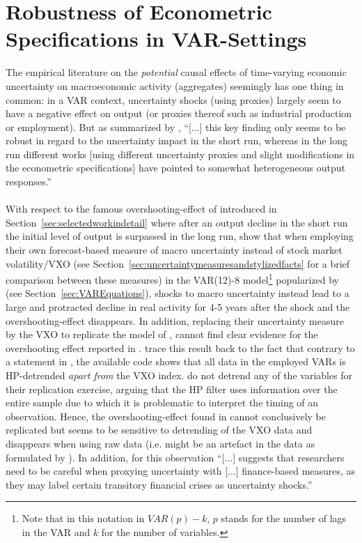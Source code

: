 \documentclass[a4paper,11pt,listof=nochaptergap,oneside,pointednumbers,bibtotoc,bigheadings,liststotoc,hidelinks]{scrbook}
\theoremstyle{mysatz}
\theoremstyle{mydefinition}
\theoremstyle{mytheorem}
\theoremstyle{mybemerkung}
\begin{document}
\section[Robustness of Econometric Specifications in VAR-Settings]{Robustness of Econometric Specifications in VAR-Settings}
\label{sec:robustnessofeconspecs}
The empirical literature on the \textit{potential} causal effects of time-varying economic uncertainty on macroeconomic activity (aggregates) seemingly has one thing in common: in a VAR context, uncertainty shocks (using proxies) largely seem to have a negative effect on output (or proxies thereof such as industrial production or employment). But as summarized by \citet[p. 23]{bontempietal:16}, ``[...] this key finding only seems to be robust in regard to the uncertainty impact in the short run, whereas in the long run different works [using different uncertainty proxies and slight modifications in the econometric specifications] have pointed to somewhat heterogeneous output responses.''\\
\\
With respect to the famous overshooting-effect of \citet{bloom:09} introduced in Section~\ref{sec:selectedworkindetail} where after an output decline in the short run the initial level of output is surpassed in the long run, \citet{juradoetal:15} show that when employing their own forecast-based measure of macro uncertainty instead of stock market volatility/VXO (see Section~\ref{sec:uncertaintymeasuresandstylizedfacts} for a brief comparison between these measures) in the VAR(12)-8 model\footnote{Note that in this notation in $VAR(p)-k$, $p$ stands for the number of lags in the VAR and $k$ for the number of variables.} popularized by \citet{bloom:09} (see Section~\ref{sec:VAREquations}), shocks to macro uncertainty instead lead to a large and protracted decline in real activity for 4-5 years after the shock and the overshooting-effect disappears. In addition, replacing their uncertainty measure by the VXO to replicate the model of \citet{bloom:09}, \citet{juradoetal:15} cannot find clear evidence for the overshooting effect reported in \citet{bloom:09}. \citet{juradoetal:15} trace this result back to the fact that contrary to a statement in \citet{bloom:09}, the available code shows that all data in the employed VARs is HP-detrended \textit{apart from} the VXO index. \citet{juradoetal:15} do not detrend any of the variables for their replication exercise, arguing that the HP filter uses information over the entire sample due to which it is problematic to interpret the timing of an observation. Hence, the overshooting-effect found in \citet{bloom:09} cannot conclusively be replicated but seems to be sensitive to detrending of the VXO data and disappears when using raw data (i.e. might be an artefact in the data as formulated by \citealp{bontempietal:16}). In addition, for \citet[p. 24]{bontempietal:16} this observation ``[...] suggests that researchers need to be careful when proxying uncertainty with [...] finance-based measures, as they may label certain transitory financial crises as uncertainty shocks.''
\end{document}
